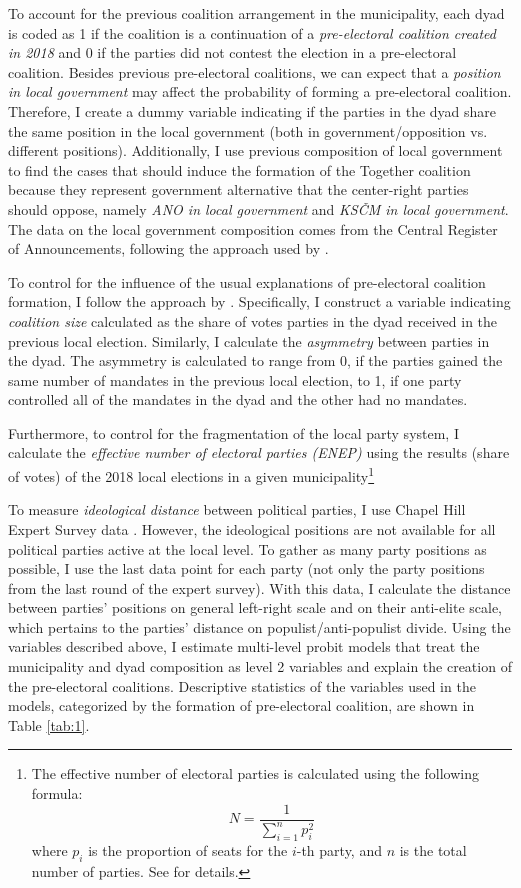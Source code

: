 \documentclass[]{interact}
\theoremstyle{plain}%
\theoremstyle{definition}
\theoremstyle{remark}
\begin{document}
To account for the previous coalition arrangement in the municipality, each dyad is coded as 1 if the coalition is a continuation of a \emph{pre-electoral coalition created in 2018} and 0 if the parties did not contest the election in a pre-electoral coalition. 
Besides previous pre-electoral coalitions, we can expect that a \emph{position in local government} may affect the probability of forming a pre-electoral coalition. Therefore, I create a dummy variable indicating if the parties in the dyad share the same position in the local government (both in government/opposition vs. different positions). Additionally, I use previous composition of local government to find the cases that should induce the formation of the Together coalition because they represent government alternative that the center-right parties should oppose, namely \emph{ANO in local government} and \emph{KSČM in local government}. 
The data on the local government composition comes from the Central Register of Announcements, following the approach used by \citet{skvrnak2021}.

To control for the influence of the usual explanations of pre-electoral coalition formation, I follow the approach by \citet{golder2006}. Specifically, I construct a variable indicating \emph{coalition size} calculated as the share of votes parties in the dyad received in the previous local election. 
Similarly, I calculate the \emph{asymmetry} between parties in the dyad. The asymmetry is calculated to range from 0, if the parties gained the same number of mandates in the previous local election, to 1, if one party controlled all of the mandates in the dyad and the other had no mandates.

Furthermore, to control for the fragmentation of the local party system, I calculate the \emph{effective number of electoral parties (ENEP)} using the results (share of votes) of the 2018 local elections in a given municipality\footnote{The effective number of electoral parties is calculated using the following formula:
\[
N = \frac{1}{\sum_{i=1}^n p_i^2}
\]
where \( p_i \) is the proportion of seats for the \( i \)-th party, and \( n \) is the total number of parties. See \citet{enep} for details.} 

To measure \emph{ideological distance} between political parties, I use Chapel Hill Expert Survey data \citep{jolly2022}. However, the ideological positions are not available for all political parties active at the local level. To gather as many party positions as possible, I use the last data point for each party (not only the party positions from the last round of the expert survey). With this data, I calculate the distance between parties' positions on general left-right scale and on their anti-elite scale, which pertains to the parties' distance on populist/anti-populist divide. 
Using the variables described above, I estimate multi-level probit models that treat the municipality and dyad composition as level 2 variables and explain the creation of the pre-electoral coalitions. Descriptive statistics of the variables used in the models, categorized by the formation of pre-electoral coalition, are shown in Table \ref{tab:1}.
\end{document}
